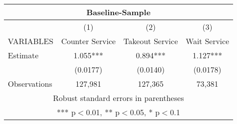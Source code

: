 \begin{tabular}{lccc}
\multicolumn{4}{c}{Baseline-Sample} \\ \hline
 & (1) & (2) & (3) \\
VARIABLES & Counter Service & Takeout Service & Wait Service \\ \hline
Estimate & 1.055*** & 0.894*** & 1.127*** \\
 & (0.0177) & (0.0140) & (0.0178) \\
 Observations & 127,981 & 127,365 & 73,381 \\ \hline
\multicolumn{4}{c}{ Robust standard errors in parentheses} \\
\multicolumn{4}{c}{ *** p$<$0.01, ** p$<$0.05, * p$<$0.1} \\
\end{tabular}
